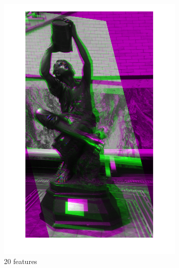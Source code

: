 \documentclass[sigconf]{acmart/acmart}
\begin{document}
\begin{figure}[h]
	\centering
	\begin{subfigure}[b]{0.3\textwidth}
		\centering
		\includegraphics[width=\textwidth]{figures/alignment/fused_20_features_16_iterations}
		\caption{20 features}
	\end{subfigure}
	\begin{subfigure}[b]{0.3\textwidth}
		\centering

\end{subfigure}
\end{figure}
\end{document}
